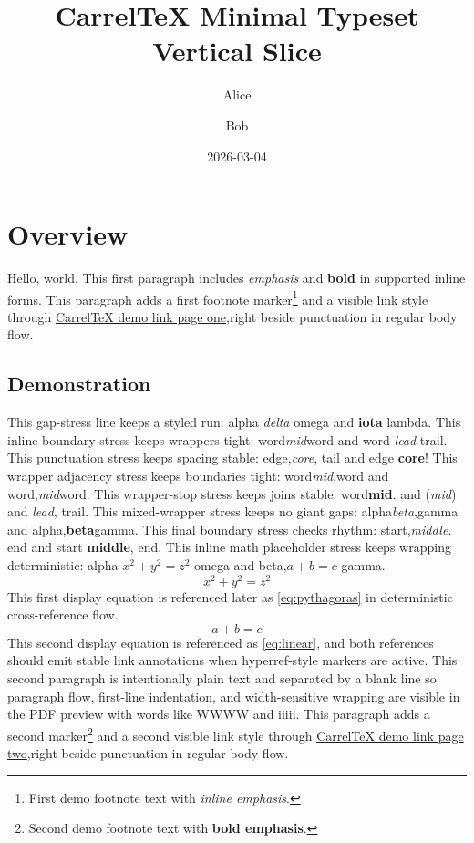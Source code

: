 \documentclass{article}
\title{CarrelTeX Minimal Typeset Vertical Slice}
\author{Alice \and Bob}
\date{2026-03-04}
\begin{document}
\maketitle
\tableofcontents

\section{Overview}
Hello, world. This first paragraph includes \emph{emphasis} and \textbf{bold} in supported inline forms.
This paragraph adds a first footnote marker\footnote{First demo footnote text with \emph{inline emphasis}.} and a visible link style through \href{https://example.com/page1}{CarrelTeX demo link page one},right beside punctuation in regular body flow.

\pagebreak

\subsection{Demonstration}
This gap-stress line keeps a styled run: alpha \emph{delta} omega and \textbf{iota} lambda.
This inline boundary stress keeps wrappers tight: word\emph{mid}word and word \emph{lead} trail.
This punctuation stress keeps spacing stable: edge,\emph{core}, tail and edge \textbf{core}!
This wrapper adjacency stress keeps boundaries tight: word\emph{mid},word and word,\emph{mid}word.
This wrapper-stop stress keeps joins stable: word\textbf{mid}. and (\emph{mid}) and \emph{lead}, trail.
This mixed-wrapper stress keeps no giant gaps: alpha\emph{beta},gamma and alpha,\textbf{beta}gamma.
This final boundary stress checks rhythm: start,\emph{middle}. end and start \textbf{middle}, end.
This inline math placeholder stress keeps wrapping deterministic: alpha $x^2 + y^2 = z^2$ omega and beta,$a+b=c$ gamma.
\[
x^2 + y^2 = z^2
\]
\label{eq:pythagoras}
This first display equation is referenced later as \ref{eq:pythagoras} in deterministic cross-reference flow.
\[
a + b = c
\]
\label{eq:linear}
This second display equation is referenced as \ref{eq:linear}, and both references should emit stable link annotations when hyperref-style markers are active.
This second paragraph is intentionally plain text and separated by a blank line so paragraph flow,\linebreak
first-line indentation, and width-sensitive wrapping are visible in the PDF preview with words like WWWW and iiiii.
This paragraph adds a second marker\footnote{Second demo footnote text with \textbf{bold emphasis}.} and a second visible link style through \href{https://example.com/page2}{CarrelTeX demo link page two},right beside punctuation in regular body flow.
\pagebreak
\end{document}
